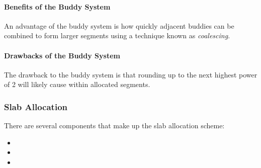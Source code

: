 \paragraph{Benefits of the Buddy System}\label{par:Buddy_System_Benefits}
An advantage of the buddy system is how quickly adjacent buddies can be combined to form larger segments using a technique known as \emph{coalescing}.

\paragraph{Drawbacks of the Buddy System}\label{par:Buddy_System_Drawbacks}
The drawback to the buddy system is that rounding up to the next highest power of 2 will likely cause  within allocated segments.

\subsubsection{Slab Allocation}\label{subsubsec:Slab_Allocation}
There are several components that make up the slab allocation scheme:
\begin{itemize}[noitemsep]
\item {}
\item {}
\item {}
\end{itemize}


